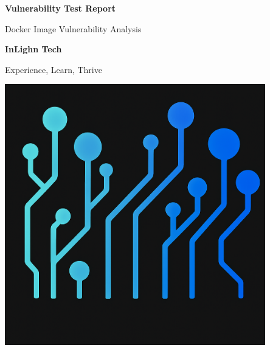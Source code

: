 \documentclass[10pt]{article}
\newcommand{\ReportTitle}{Vulnerability Test Report}
\newcommand{\CompanyName}{InLighn Tech}
\newcommand{\CompanyTagline}{Experience, Learn, Thrive}
\newcommand{\ReportSubtitle}{Docker Image Vulnerability Analysis}
\begin{document}
\begin{titlepage}
\pagecolor{exactbg}
\color{white}
\vspace*{2.8cm}

\begin{center}
  {\Huge \textbf{\ReportTitle} \par}
  \vspace{0.6cm}
  {\large \ReportSubtitle \par}
  \vspace{1.4cm}
  {\Huge \textbf{\CompanyName}\par}
  \vspace{0.4cm}
  {\Large \CompanyTagline \par}
  \vspace{2cm}

  \begin{minipage}{0.85\textwidth}
    \centering
    \includegraphics[width=0.85\textwidth]{assets/a.png}
  \end{minipage}

  \vfill


\end{center}
\end{titlepage}
\end{document}
